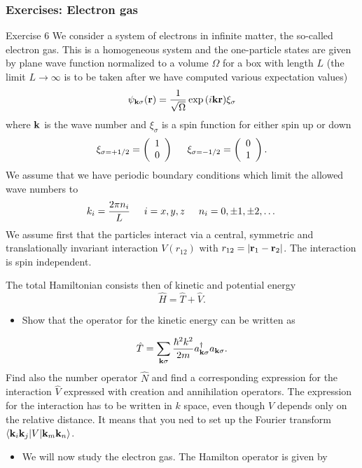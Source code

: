 \documentclass{beamer}
\begin{document}
\begin{frame}
\frametitle{Exercises: Electron gas}

\begin{block}{Exercise 6 }
We consider a system of electrons in infinite matter, the so-called electron gas. This is a homogeneous system and the one-particle states are given by plane wave function normalized to a volume $\Omega$ 
for a box with length $L$ (the limit $L\rightarrow \infty$ is to be taken after we have computed various expectation values)
\[
\psi_{{\bf k}\sigma}({\bf r})= \frac{1}{\sqrt{\Omega}}\exp{(i{\bf kr})}\xi_{\sigma}
\]
where ${\bf k}$ is the wave number and  $\xi_{\sigma}$ is a spin function for either spin up or down
\[ 
\xi_{\sigma=+1/2}=\left(\begin{array}{c} 1 \\ 0 \end{array}\right) \hspace{0.5cm}
\xi_{\sigma=-1/2}=\left(\begin{array}{c} 0 \\ 1 \end{array}\right).
\]
We assume that we have periodic boundary conditions which limit the allowed wave numbers to
\[
k_i=\frac{2\pi n_i}{L}\hspace{0.5cm} i=x,y,z \hspace{0.5cm} n_i=0,\pm 1,\pm 2, \dots
\]
We assume first that the particles interact via a central, symmetric and translationally invariant
interaction  $V(r_{12})$ with
$r_{12}=|{\bf r}_1-{\bf r}_2|$.  The interaction is spin independent.

The total Hamiltonian consists then of kinetic and potential energy
\[
\hat{H} = \hat{T}+\hat{V}.
\]
\begin{itemize}
 \item Show that the operator for the kinetic energy can be written as
\end{itemize}

\noindent
\[
\hat{T}=\sum_{{\bf k}\sigma}\frac{\hbar^2k^2}{2m}a_{{\bf k}\sigma}^{\dagger}a_{{\bf k}\sigma}.
\]
Find also the number operator $\hat{N}$ and find a corresponding expression for the interaction
$\hat{V}$ expressed with creation and annihilation operators.   The expression for the interaction
has to be written in  $k$ space, even though $V$ depends only on the relative distance. It means that you ned to set up the Fourier transform $\langle {\bf k}_i{\bf k}_j| V | {\bf k}_m{\bf k}_n\rangle$.
\begin{itemize}
 \item We will now study the electron gas. The Hamilton operator is given by
\end{itemize}


\end{block}
\end{frame}
\end{document}
